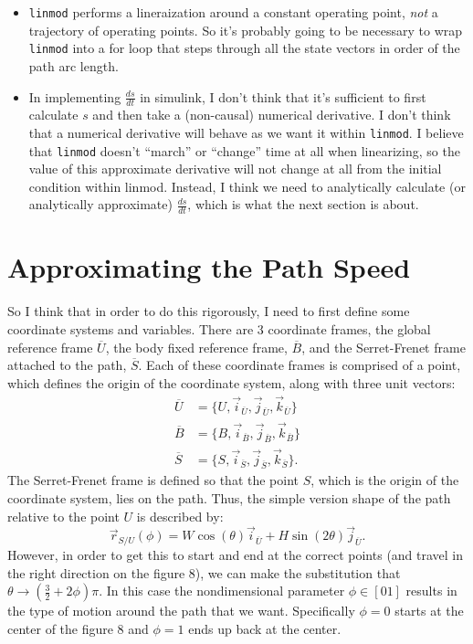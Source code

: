 \documentclass[12pt]{article}
\newcommand{\unitvec}[2]{\vec{#1}_{\overline{#2}}}
\begin{document}
\begin{itemize}
	\item \texttt{linmod} performs a lineraization around a constant operating point, \emph{not} a trajectory of operating points.  So it's probably going to be necessary to wrap \texttt{linmod} into a for loop that steps through all the state vectors in order of the path arc length.
	\item In implementing $\frac{ds}{dt}$ in simulink, I don't think that it's sufficient to first calculate $s$ and then take a (non-causal) numerical derivative.  I don't think that a numerical derivative will behave as we want it within \texttt{linmod}.  I believe that \texttt{linmod} doesn't ``march'' or ``change'' time at all when linearizing, so the value of this approximate derivative will not change at all from the initial condition within linmod.  Instead, I think we need to analytically calculate (or analytically approximate) $\frac{ds}{dt}$, which is what the next section is about.
\end{itemize}
\section*{Approximating the Path Speed}
So I think that in order to do this rigorously, I need to first define some coordinate systems and variables.  There are 3 coordinate frames, the global reference frame $\overline{U}$, the body fixed reference frame, $\overline{B}$, and the Serret-Frenet frame attached to the path, $\overline{S}$.  Each of these coordinate frames is comprised of a point, which defines the origin of the coordinate system, along with three unit vectors:
\begin{align}
\overline{U} &= \{U,\unitvec{i}{U},\unitvec{j}{U},\unitvec{k}{U}\}\\
\overline{B} &= \{B,\unitvec{i}{B},\unitvec{j}{B},\unitvec{k}{B}\}\\
\overline{S} &= \{S,\unitvec{i}{S},\unitvec{j}{S},\unitvec{k}{S}\}.
\end{align}
The Serret-Frenet frame is defined so that the point $S$, which is the origin of the coordinate system, lies on the path.  Thus, the simple version shape of the path relative to the point $U$ is described by:
\begin{equation}\label{eqn:pathShape}
\vec{r}_{S/U}(\phi)=W \cos(\theta) \unitvec{i}{U} + H \sin (2\theta)\unitvec{j}{U}.
\end{equation}
However, in order to get this to start and end at the correct points (and travel in the right direction on the figure 8), we can make the substitution that $\theta \rightarrow \left(\frac{3}{2}+2\phi\right)\pi$.  In this case the nondimensional parameter $\phi\in[0 1]$ results in the type of motion around the path that we want.  Specifically $\phi = 0$ starts at the center of the figure 8 and $\phi=1$ ends up back at the center.
\end{document}
